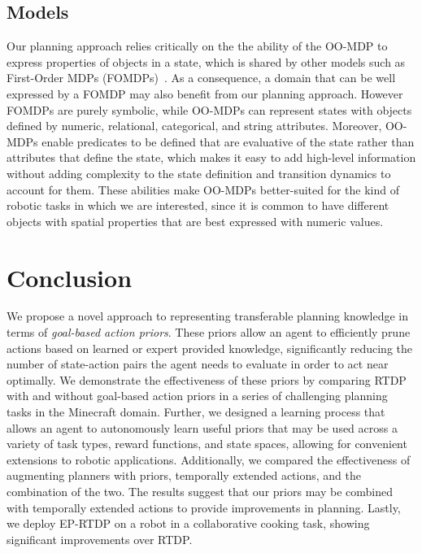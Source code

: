 \documentclass[letterpaper]{article}
\begin{document}
\subsection{Models}
Our planning approach relies critically on the the ability of the OO-MDP to express properties of objects in a state, which is shared by other models such as First-Order MDPs (FOMDPs)~\cite{boutilier2001symbolic}. As a consequence, a domain that can be well expressed by a FOMDP may also benefit from our planning approach. However FOMDPs are purely symbolic, while OO-MDPs can represent states with objects defined by numeric, relational, categorical, and string attributes. Moreover, OO-MDPs enable predicates to be defined that are evaluative of the state rather than attributes that define the state, which makes it easy to add high-level information without adding complexity to the state definition and transition dynamics to account for them. These abilities make OO-MDPs better-suited for the kind of robotic tasks in which we are interested, since it is common to have different objects with spatial properties that are best expressed with numeric values.


\section{Conclusion}
\label{sec:conclusion}
We propose a novel approach to representing transferable planning
knowledge in terms of {\em goal-based action priors}. These priors
allow an agent to efficiently prune actions based on learned or expert
provided knowledge, significantly reducing the number of state-action
pairs the agent needs to evaluate in order to act near optimally. We
demonstrate the effectiveness of these priors by comparing
RTDP with and without goal-based action priors in a series of challenging
planning tasks in the Minecraft domain. Further, we designed a
learning process that allows an agent to autonomously learn useful
priors that may be used across a variety of task types, reward
functions, and state spaces, allowing for convenient extensions to
robotic applications. Additionally, we compared the effectiveness of
augmenting planners with priors, temporally extended actions,
and the combination of the two. The results suggest that our priors
may be combined with temporally extended actions to provide
improvements in planning.  Lastly, we deploy EP-RTDP
on a robot in a collaborative cooking task, showing significant improvements over RTDP.
\end{document}
